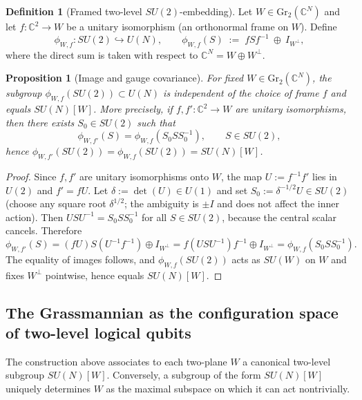 \documentclass{article}%
\newtheorem{proposition}[theorem]{Proposition}
\theoremstyle{definition}
\newtheorem{definition}[theorem]{Definition}
\numberwithin{equation}{section}
\newcommand{\C}{\mathbb{C}}
\newcommand{\Gr}{\mathrm{Gr}}
\begin{document}
\begin{definition}[Framed two-level $SU(2)$-embedding]\label{def:framed_two_level_embedding}
Let $W\in\Gr_2(\C^N)$ and let $f:\C^2\to W$ be a unitary isomorphism (an orthonormal frame on $W$).
Define
\begin{equation}\label{eq:two_level_embedding_SU2}
\phi_{W,f}:SU(2)\hookrightarrow U(N),\qquad
\phi_{W,f}(S)\;:=\; f S f^{-1}\ \oplus\ I_{W^\perp},
\end{equation}
where the direct sum is taken with respect to $\C^N=W\oplus W^\perp$.
\end{definition}

\begin{proposition}[Image and gauge covariance]\label{prop:gauge_invariance_SU2}
For fixed $W\in\Gr_2(\C^N)$, the subgroup $\phi_{W,f}(SU(2))\subset U(N)$ is independent of the
choice of frame $f$ and equals $SU(N)[W]$. More precisely, if $f,f':\C^2\to W$ are unitary
isomorphisms, then there exists $S_0\in SU(2)$ such that
\[
\phi_{W,f'}(S)=\phi_{W,f}(S_0 S S_0^{-1}),\qquad S\in SU(2),
\]
hence $\phi_{W,f'}(SU(2))=\phi_{W,f}(SU(2))=SU(N)[W]$.
\end{proposition}

\begin{proof}
Since $f,f'$ are unitary isomorphisms onto $W$, the map $U:=f^{-1}f'$ lies in $U(2)$ and $f'=fU$.
Let $\delta:=\det(U)\in U(1)$ and set $S_0:=\delta^{-1/2}U\in SU(2)$ (choose any square root
$\delta^{1/2}$; the ambiguity is $\pm I$ and does not affect the inner action). Then $USU^{-1}=S_0SS_0^{-1}$
for all $S\in SU(2)$, because the central scalar cancels. Therefore
\[
\phi_{W,f'}(S)=(fU)S(U^{-1}f^{-1})\oplus I_{W^\perp}
=f(USU^{-1})f^{-1}\oplus I_{W^\perp}
=\phi_{W,f}(S_0SS_0^{-1}).
\]
The equality of images follows, and $\phi_{W,f}(SU(2))$ acts as $SU(W)$ on $W$ and fixes $W^\perp$
pointwise, hence equals $SU(N)[W]$.
\end{proof}


\subsection{The Grassmannian as the configuration space of two-level logical qubits}
\label{subsec:grassmannian_logical_qubits}

The construction above associates to each two-plane $W$ a canonical two-level subgroup $SU(N)[W]$.
Conversely, a subgroup of the form $SU(N)[W]$ uniquely determines $W$ as the maximal subspace on which
it can act nontrivially.
\end{document}
